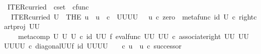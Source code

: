 \begin{isabellebody}
\isamarkupfalse%
%
\endisatagproof
{\isafoldproof}%
%
\isadelimproof
%
\endisadelimproof
%
\isadelimdocument
%
\endisadelimdocument
%
\isatagdocument
%
\isamarkuptrue%
%
\endisatagdocument
{\isafolddocument}%
%
\isadelimdocument
%
\endisadelimdocument
{}\isamarkupfalse%
\ ITER{\isacharunderscore}{\kern0pt}curried\ {\isacharcolon}{\kern0pt}{\isacharcolon}{\kern0pt}\ {\isachardoublequoteopen}cset\ {\isasymRightarrow}\ cfunc{\isachardoublequoteclose}\ \ \isanewline
\ \ {\isachardoublequoteopen}ITER{\isacharunderscore}{\kern0pt}curried\ U\ {\isacharequal}{\kern0pt}\ {\isacharparenleft}{\kern0pt}THE\ u\ {\isachardot}{\kern0pt}\ u\ {\isacharcolon}{\kern0pt}\ {\isasymnat}\isactrlsub c\ {\isasymrightarrow}\ {\isacharparenleft}{\kern0pt}U\isactrlbsup U\isactrlesup {\isacharparenright}{\kern0pt}\isactrlbsup U\isactrlbsup U\isactrlesup \isactrlesup \ {\isasymand}\ \ u\ {\isasymcirc}\isactrlsub c\ zero\ {\isacharequal}{\kern0pt}\ {\isacharparenleft}{\kern0pt}metafunc\ {\isacharparenleft}{\kern0pt}id\ U{\isacharparenright}{\kern0pt}\ {\isasymcirc}\isactrlsub c\ {\isacharparenleft}{\kern0pt}right{\isacharunderscore}{\kern0pt}cart{\isacharunderscore}{\kern0pt}proj\ {\isacharparenleft}{\kern0pt}U\isactrlbsup U\isactrlesup {\isacharparenright}{\kern0pt}\ {\isasymone}{\isacharparenright}{\kern0pt}{\isacharparenright}{\kern0pt}\isactrlsup {\isasymsharp}\ {\isasymand}\isanewline
\ \ \ \ {\isacharparenleft}{\kern0pt}{\isacharparenleft}{\kern0pt}meta{\isacharunderscore}{\kern0pt}comp\ U\ U\ U{\isacharparenright}{\kern0pt}\ {\isasymcirc}\isactrlsub c\ {\isacharparenleft}{\kern0pt}id\ {\isacharparenleft}{\kern0pt}U\isactrlbsup U\isactrlesup {\isacharparenright}{\kern0pt}\ {\isasymtimes}\isactrlsub f\ eval{\isacharunderscore}{\kern0pt}func\ {\isacharparenleft}{\kern0pt}U\isactrlbsup U\isactrlesup {\isacharparenright}{\kern0pt}\ {\isacharparenleft}{\kern0pt}U\isactrlbsup U\isactrlesup {\isacharparenright}{\kern0pt}{\isacharparenright}{\kern0pt}\ {\isasymcirc}\isactrlsub c\ {\isacharparenleft}{\kern0pt}associate{\isacharunderscore}{\kern0pt}right\ {\isacharparenleft}{\kern0pt}U\isactrlbsup U\isactrlesup {\isacharparenright}{\kern0pt}\ {\isacharparenleft}{\kern0pt}U\isactrlbsup U\isactrlesup {\isacharparenright}{\kern0pt}\ {\isacharparenleft}{\kern0pt}{\isacharparenleft}{\kern0pt}U\isactrlbsup U\isactrlesup {\isacharparenright}{\kern0pt}\isactrlbsup U\isactrlbsup U\isactrlesup \isactrlesup {\isacharparenright}{\kern0pt}{\isacharparenright}{\kern0pt}\ {\isasymcirc}\isactrlsub c\ {\isacharparenleft}{\kern0pt}diagonal{\isacharparenleft}{\kern0pt}U\isactrlbsup U\isactrlesup {\isacharparenright}{\kern0pt}{\isasymtimes}\isactrlsub f\ id\ {\isacharparenleft}{\kern0pt}{\isacharparenleft}{\kern0pt}U\isactrlbsup U\isactrlesup {\isacharparenright}{\kern0pt}\isactrlbsup U\isactrlbsup U\isactrlesup \isactrlesup {\isacharparenright}{\kern0pt}{\isacharparenright}{\kern0pt}{\isacharparenright}{\kern0pt}\isactrlsup {\isasymsharp}\ \ \ \ {\isasymcirc}\isactrlsub c\ u\ {\isacharequal}{\kern0pt}\ u\ {\isasymcirc}\isactrlsub c\ successor{\isacharparenright}{\kern0pt}{\isachardoublequoteclose}\isanewline

\end{isabellebody}
